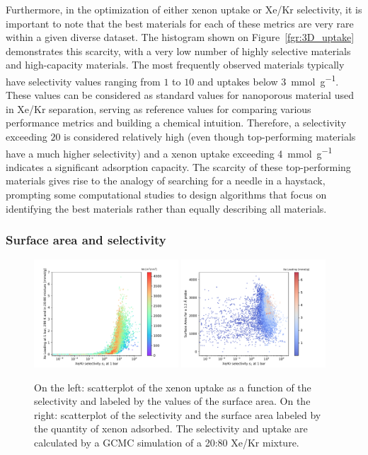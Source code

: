 \documentclass[main.tex]{subfiles}
\begin{document}
Furthermore, in the optimization of either xenon uptake or Xe/Kr selectivity, it is important to note that the best materials for each of these metrics are very rare within a given diverse dataset. The histogram shown on Figure~\ref{fgr:3D_uptake} demonstrates this scarcity, with a very low number of highly selective materials and high-capacity materials. The most frequently observed materials typically have selectivity values ranging from $1$ to $10$ and uptakes below \SI{3}{\milli\mole\per\gram}. These values can be considered as standard values for nanoporous material used in Xe/Kr separation, serving as reference values for comparing various performance metrics and building a chemical intuition. Therefore, a selectivity exceeding $20$ is considered relatively high (even though top-performing materials have a much higher selectivity\autocite{Pei_2022}) and a xenon uptake exceeding \SI{4}{\milli\mole\per\gram} indicates a significant adsorption capacity. The scarcity of these top-performing materials gives rise to the analogy of searching for a needle in a haystack, prompting some computational studies to design algorithms that focus on identifying the best materials rather than equally describing all materials.\autocite{Deshwal_2021,Glasby_2021} 

\subsubsection{Surface area and selectivity}

\begin{figure}[ht!]
  \centering
  \includegraphics[width=0.48\textwidth]{figures/2-thermo/Scatterplot_uptake_selectivity_sa.pdf}
  \includegraphics[width=0.48\textwidth]{figures/2-thermo/Scatterplot_sa_selectivity.pdf}
  \caption{On the left: scatterplot of the xenon uptake as a function of the selectivity and labeled by the values of the surface area. On the right: scatterplot of the selectivity and the surface area labeled by the quantity of xenon adsorbed. The selectivity and uptake are calculated by a GCMC simulation of a 20:80 Xe/Kr mixture.}\label{fgr:sa}
\end{figure}
\end{document}
